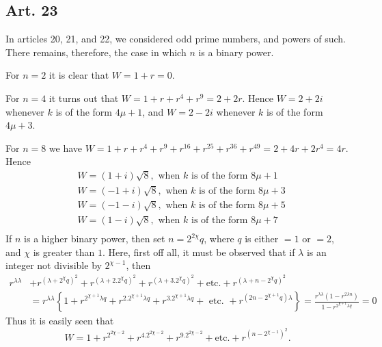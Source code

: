 \documentclass{book}
\theoremstyle{plain}
\theoremstyle{remark}
\begin{document}
\subsection*{Art. 23}

In articles 20, 21, and 22, we considered odd prime numbers, and powers of such.  There remains, therefore, the case in which $n$ is a binary power. 

For $n=2$ it is clear that $W = 1+r = 0$. 

For $n=4$ it turns out that $W = 1 + r + r^4 + r^9 = 2 + 2r$.  Hence $W = 2 + 2i$ whenever $k$ is of the form $4\mu+1$, and $W = 2-2i$ whenever $k$ is of the form $4\mu+3$.  

For $n=8$ we have $W = 1 + r + r^4 + r^9 + r^{16} + r^{25} + r^{36} + r^{49} = 2 + 4r + 2r^4 = 4r$.  Hence 
\begin{align*} 
& W = (1+i) \sqrt{8}, \textrm{ when } k \textrm{ is of the form } 8 \mu + 1 \\
& W = (-1+i) \sqrt{8}, \textrm{ when } k \textrm{ is of the form } 8 \mu + 3 \\
& W = (-1-i) \sqrt{8}, \textrm{ when } k \textrm{ is of the form } 8 \mu + 5 \\
& W = (1-i) \sqrt{8}, \textrm{ when } k \textrm{ is of the form } 8 \mu + 7 \\
\end{align*} 
If $n$ is a higher binary power, then set $n = 2^{2\chi}q$, where $q$ is either $=1$ or $=2$, and $\chi$ is greater than $1$.  Here, first off all, it must be observed that if $\lambda$ is an integer not divisible by $2^{\chi -1}$, then 
\begin{align*} 
r^{\lambda\lambda} & + r^{(\lambda+2^{\chi}q)^2} + r^{(\lambda+2.2^{\chi}q)^2} + r^{(\lambda+3.2^{\chi}q)^2} + \textrm{etc.} + r^{(\lambda+n - 2^{\chi}q)^2} \\
&= r^{\lambda\lambda}\left\{ 1 + r^{2^{\chi+1}\lambda q} + r^{2.2^{\chi+1} \lambda q} + r^{3.2^{\chi+1}\lambda q} + \textrm{ etc. }+ r^{\left(2n - 2^{\chi + 1} q\right)\lambda} \right \}  = \frac{r^{\lambda\lambda}(1-r^{2\lambda n})}{1-r^{2^{\chi+1}\lambda q}} = 0 
\end{align*}
 Thus it is easily seen that
 \[ W = 1 + r^{2^{2\chi -2}} + r^{4.2^{2\chi-2}} + r^{9.2^{2\chi-2}} + \textrm{etc.}+r^{(n-2^{\chi-1})^2}. \]
 
\end{document}
